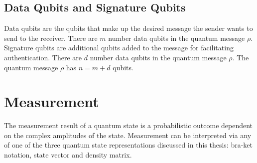 \subsection{Data Qubits and Signature Qubits}
Data qubits are the qubits that make up the desired message the sender wants to send to the receiver. There are $m$ number data qubits in the quantum message $\rho$. Signature qubits are additional qubits added to the message for facilitating authentication. There are $d$ number data qubits in the quantum message $\rho$. The quantum message $\rho$ has $n = m + d$ qubits.
\section{Measurement}
\label{subsec:Measurements}
The measurement result of a quantum state is a probabilistic outcome dependent on the complex amplitudes of the state. Measurement can be interpreted via any of one of the three quantum state representations discussed in this thesis: bra-ket notation, state vector and density matrix.

